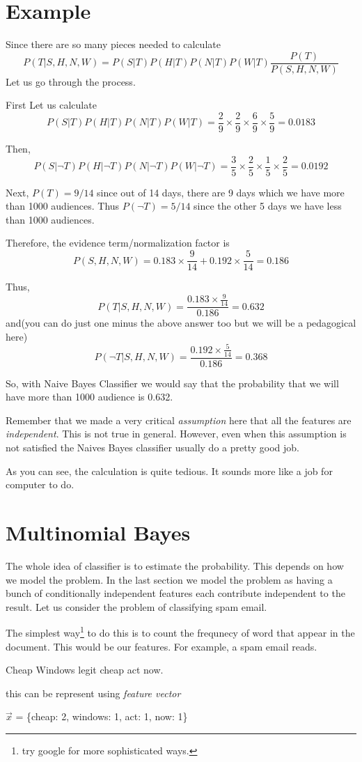 \documentclass[a4paper, 12pt]{article}
\begin{document}
\section*{Example}
Since there are so many pieces needed to calculate
\[
P(T | S,H,N,W) =  P(S|T) P(H|T) P(N|T) P(W|T) \frac{P(T)}{P(S,H,N,W)}
\]
Let us go through the process.

First Let us calculate
\[
P(S|T) P(H|T) P(N|T) P(W|T) = \frac{2}{9}\times\frac{2}{9} \times \frac{6}{9} \times \frac{5}{9} = 0.0183
\]

Then,
\[
P(S| \lnot T) P(H| \lnot T) P(N|\lnot T) P(W|\lnot T) = \frac{3}{5}\times\frac{2}{5} \times \frac{1}{5} \times \frac{2}{5} = 0.0192
\]

Next, $P(T) = 9/14$ since out of 14 days, there are 9 days which we have more than \num{1000} audiences. Thus $P(\lnot T) = 5/14$ since the other 5 days we have less than \num{1000} audiences.

Therefore, the evidence term/normalization factor is
\[
	P(S, H, N, W) = 0.183 \times \frac{9}{14} + 0.192 \times \frac{5}{14} = 0.186
\]

Thus,
\[
	P(T | S, H, N, W) = \frac{0.183 \times \frac{9}{14}}{0.186} = 0.632
\]
and(you can do just one minus the above answer too but we will be a pedagogical here)
\[
	P(\lnot T | S, H, N, W) = \frac{0.192 \times \frac{5}{14}}{0.186} = 0.368
\]

So, with Naive Bayes Classifier we would say that the probability that we will have more than \num{1000} audience is 0.632.

Remember that we made a very critical \emph{assumption} here that all the features are \emph{independent}. This is not true in general. However, even when this assumption is not satisfied the Naives Bayes classifier usually do a pretty good job.

As you can see, the calculation is quite tedious. It sounds more like a job for computer to do.

\section*{Multinomial Bayes}

The whole idea of classifier is to estimate the probability. This depends on how we model the problem. In the last section we model the problem as having a bunch of conditionally independent features each contribute independent to the result. Let us consider the problem of classifying spam email.

The simplest way\footnote{try google for more sophisticated ways.} to do this is to count the frequnecy of word that appear in the document. This would be our features. For example, a spam email reads.
\begin{center}
	Cheap Windows legit cheap act now.
\end{center}
this can be represent using \emph{feature vector}
\begin{center}
	$\vec{x}$ = \{cheap: 2, windows: 1, act: 1, now: 1\}
\end{center}
\end{document}
